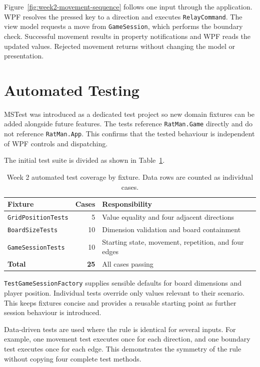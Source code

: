 

Figure~\ref{fig:week2-movement-sequence} follows one input through the application. WPF resolves the pressed key to a direction and executes \texttt{RelayCommand}. The view model requests a move from \texttt{GameSession}, which performs the boundary check. Successful movement results in property notifications and WPF reads the updated values. Rejected movement returns without changing the model or presentation.

\section{Automated Testing}

MSTest was introduced as a dedicated test project so new domain fixtures can be added alongside future features. The tests reference \texttt{RatMan.Game} directly and do not reference \texttt{RatMan.App}. This confirms that the tested behaviour is independent of WPF controls and dispatching.

The initial test suite is divided as shown in Table~\ref{tab:week2-tests}.

\begin{table}[htbp]
	\centering
	\begin{tabular}{lrl}
		\hline
		\textbf{Fixture} & \textbf{Cases} & \textbf{Responsibility} \\
		\hline
		\texttt{GridPositionTests} & 5 & Value equality and four adjacent directions \\
		\texttt{BoardSizeTests} & 10 & Dimension validation and board containment \\
		\texttt{GameSessionTests} & 10 & Starting state, movement, repetition, and four edges \\
		\hline
		\textbf{Total} & \textbf{25} & All cases passing \\
		\hline
	\end{tabular}
	\caption{Week 2 automated test coverage by fixture. Data rows are counted as individual cases.}
	\label{tab:week2-tests}
\end{table}

\texttt{TestGameSessionFactory} supplies sensible defaults for board dimensions and player position. Individual tests override only values relevant to their scenario. This keeps fixtures concise and provides a reusable starting point as further session behaviour is introduced.

Data-driven tests are used where the rule is identical for several inputs. For example, one movement test executes once for each direction, and one boundary test executes once for each edge. This demonstrates the symmetry of the rule without copying four complete test methods.

